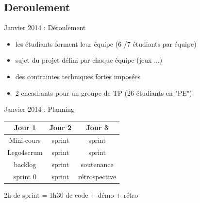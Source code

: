 \documentclass{beamer}
\begin{document}
\subsection{Deroulement}
\begin{frame}{Janvier 2014 : Déroulement}
  \begin{itemize}
    \item les étudiants forment leur équipe (6 /7 étudiants par équipe)
    \item sujet du projet défini par chaque équipe (jeux ...)
    \item des contraintes techniques fortes imposées
    \item 2 encadrants pour un groupe de TP (26 étudiants en "PE")
  \end{itemize}
\end{frame}

\begin{frame}{Janvier 2014 : Planning}
  \begin{center}
    \begin{tabular}{| c | c | c |}
      \hline
      \textbf{Jour 1} & \textbf{Jour 2} & \textbf{Jour 3} \\
      \hline \hline
      Mini-cours & sprint & sprint        \\
      \hline
      Lego4scrum    & sprint & sprint        \\
      \hline \hline
      backlog    & sprint & soutenance    \\
      \hline
      sprint 0   & sprint & rétrospective \\
      \hline
    \end{tabular}
  \end{center}
  2h de sprint = 1h30 de code + démo + rétro
\end{frame}
\end{document}
